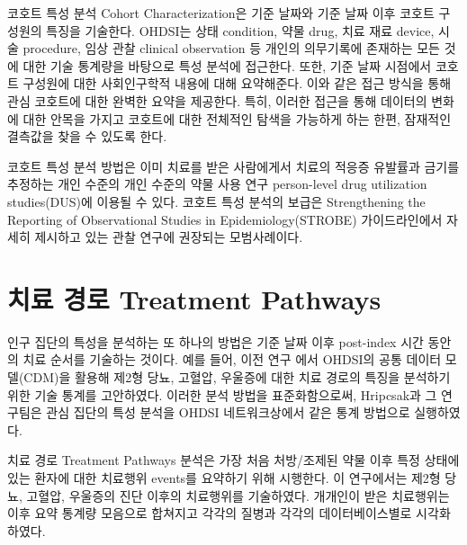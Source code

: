 \documentclass[10.5pt]{book}
\theoremstyle{definition}
\theoremstyle{definition}
\theoremstyle{definition}
\theoremstyle{remark}
\begin{document}
코호트 특성 분석 Cohort Characterization은 기준 날짜와 기준 날짜 이후
코호트 구성원의 특징을 기술한다. OHDSI는 상태 condition, 약물 drug, 치료
재료 device, 시술 procedure, 임상 관찰 clinical observation 등 개인의
의무기록에 존재하는 모든 것에 대한 기술 통계량을 바탕으로 특성 분석에
접근한다. 또한, 기준 날짜 시점에서 코호트 구성원에 대한 사회인구학적
내용에 대해 요약해준다. 이와 같은 접근 방식을 통해 관심 코호트에 대한
완벽한 요약을 제공한다. 특히, 이러한 접근을 통해 데이터의 변화에 대한
안목을 가지고 코호트에 대한 전체적인 탐색을 가능하게 하는 한편, 잠재적인
결측값을 찾을 수 있도록 한다.

코호트 특성 분석 방법은 이미 치료를 받은 사람에게서 치료의 적응증
유발률과 금기를 추정하는 개인 수준의 개인 수준의 약물 사용 연구
person-level drug utilization studies(DUS)에 이용될 수 있다. 코호트 특성
분석의 보급은 Strengthening the Reporting of Observational Studies in
Epidemiology(STROBE) 가이드라인에서 자세히 제시하고 있는 관찰 연구에
권장되는 모범사례이다. \citep{VONELM2008344}

\section{치료 경로 Treatment Pathways}\label{--treatment-pathways}

인구 집단의 특성을 분석하는 또 하나의 방법은 기준 날짜 이후 post-index
시간 동안의 치료 순서를 기술하는 것이다. 예를 들어, 이전 연구
\citep{Hripcsak7329} 에서 OHDSI의 공통 데이터 모델(CDM)을 활용해 제2형
당뇨, 고혈압, 우울증에 대한 치료 경로의 특징을 분석하기 위한 기술 통계를
고안하였다. 이러한 분석 방법을 표준화함으로써, Hripcsak과 그 연구팀은
관심 집단의 특성 분석을 OHDSI 네트워크상에서 같은 통계 방법으로
실행하였다. 

치료 경로 Treatment Pathways 분석은 가장 처음 처방/조제된 약물 이후 특정
상태에 있는 환자에 대한 치료행위 events를 요약하기 위해 시행한다. 이
연구에서는 제2형 당뇨, 고혈압, 우울증의 진단 이후의 치료행위를
기술하였다. 개개인이 받은 치료행위는 이후 요약 통계량 모음으로 합쳐지고
각각의 질병과 각각의 데이터베이스별로 시각화하였다.
\end{document}
